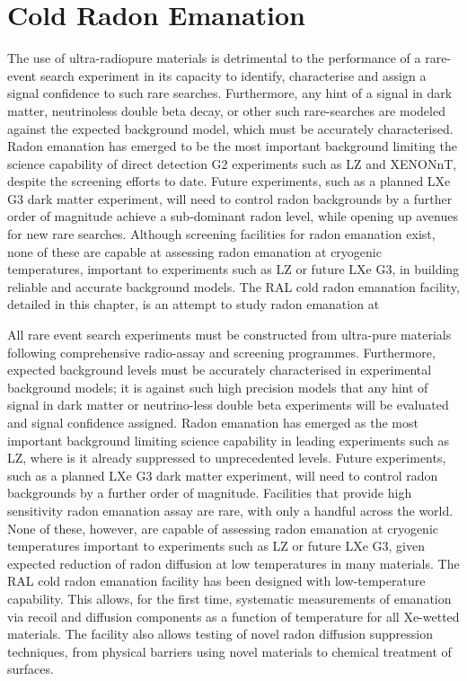 \chapter{Cold Radon Emanation}
\label{chap:chap7}

The use of ultra-radiopure materials is detrimental to the performance of a rare-event search experiment in its capacity to identify, characterise and assign a signal confidence to such rare searches. Furthermore, any hint of a signal in dark matter, neutrinoless double beta decay, or other such rare-searches are modeled against the expected background model, which must be accurately characterised. Radon emanation has emerged to be the most important background limiting the science capability of direct detection G2 experiments such as LZ and XENONnT, despite the screening efforts to date. Future experiments, such as a planned LXe G3 dark matter experiment, will need to control radon backgrounds by a further order of magnitude achieve a sub-dominant radon level, while opening up avenues for new rare searches. Although screening facilities for radon emanation exist, none of these are capable at assessing radon emanation at cryogenic temperatures, important to experiments such as LZ or future LXe G3, in building reliable and accurate background models. The RAL cold radon emanation facility, detailed in this chapter, is an attempt to study radon emanation at 




All rare event search experiments must be constructed from ultra-pure materials following comprehensive radio-assay and screening programmes. Furthermore, expected background levels must be accurately characterised in experimental background models; it is against such high precision models that any hint of signal in dark matter or neutrino-less double beta experiments will be evaluated and signal confidence assigned. Radon emanation has emerged as the most important background limiting science capability in leading experiments such as LZ, where is it already suppressed to unprecedented levels. Future experiments, such as a planned LXe G3 dark matter experiment, will need to control radon backgrounds by a further order of magnitude. Facilities that provide high sensitivity radon emanation assay are rare, with only a handful across the world. None of these, however, are capable of assessing radon emanation at cryogenic temperatures important to experiments such as LZ or future LXe G3, given expected reduction of radon diffusion at low temperatures in many materials. The RAL cold radon emanation facility has been designed with low-temperature capability. This allows, for the first time, systematic measurements of emanation via recoil and diffusion components as a function of temperature for all Xe-wetted materials. The facility also allows testing of novel radon diffusion suppression techniques, from physical barriers using novel materials to chemical treatment of surfaces.



